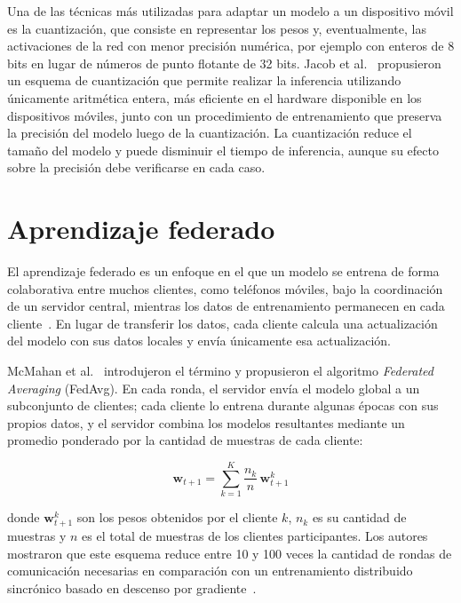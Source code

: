 Una de las técnicas más utilizadas para adaptar un modelo a un dispositivo móvil es la cuantización, que consiste en representar los pesos y, eventualmente, las activaciones de la red con menor precisión numérica, por ejemplo con enteros de 8 bits en lugar de números de punto flotante de 32 bits. Jacob et al.~\cite{jacob2018quantization} propusieron un esquema de cuantización que permite realizar la inferencia utilizando únicamente aritmética entera, más eficiente en el hardware disponible en los dispositivos móviles, junto con un procedimiento de entrenamiento que preserva la precisión del modelo luego de la cuantización. La cuantización reduce el tamaño del modelo y puede disminuir el tiempo de inferencia, aunque su efecto sobre la precisión debe verificarse en cada caso.

\section{Aprendizaje federado}

El aprendizaje federado es un enfoque en el que un modelo se entrena de forma colaborativa entre muchos clientes, como teléfonos móviles, bajo la coordinación de un servidor central, mientras los datos de entrenamiento permanecen en cada cliente~\cite{mcmahan2017fedavg, kairouz2021advances}. En lugar de transferir los datos, cada cliente calcula una actualización del modelo con sus datos locales y envía únicamente esa actualización.

McMahan et al.~\cite{mcmahan2017fedavg} introdujeron el término y propusieron el algoritmo \emph{Federated Averaging} (FedAvg). En cada ronda, el servidor envía el modelo global a un subconjunto de clientes; cada cliente lo entrena durante algunas épocas con sus propios datos, y el servidor combina los modelos resultantes mediante un promedio ponderado por la cantidad de muestras de cada cliente:

\begin{equation}
    \mathbf{w}_{t+1} = \sum_{k=1}^{K} \frac{n_k}{n} \, \mathbf{w}_{t+1}^{k}
\end{equation}

donde $\mathbf{w}_{t+1}^{k}$ son los pesos obtenidos por el cliente $k$, $n_k$ es su cantidad de muestras y $n$ es el total de muestras de los clientes participantes. Los autores mostraron que este esquema reduce entre 10 y 100 veces la cantidad de rondas de comunicación necesarias en comparación con un entrenamiento distribuido sincrónico basado en descenso por gradiente~\cite{mcmahan2017fedavg}.

